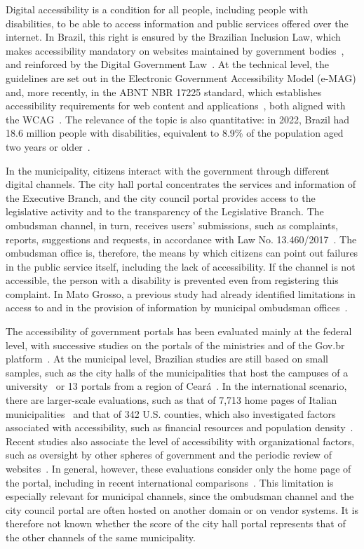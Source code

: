 \documentclass[12pt]{article}
\begin{document}
Digital accessibility is a condition for all people, including people with disabilities, to be able to access information and public services offered over the internet. In Brazil, this right is ensured by the Brazilian Inclusion Law, which makes accessibility mandatory on websites maintained by government bodies~\cite{lbi2015}, and reinforced by the Digital Government Law~\cite{lei14129}. At the technical level, the guidelines are set out in the Electronic Government Accessibility Model (e-MAG) and, more recently, in the ABNT NBR 17225 standard, which establishes accessibility requirements for web content and applications~\cite{nbr17225}, both aligned with the WCAG~\cite{wcag21}. The relevance of the topic is also quantitative: in 2022, Brazil had 18.6 million people with disabilities, equivalent to 8.9\% of the population aged two years or older~\cite{pnad2022}.

In the municipality, citizens interact with the government through different digital channels. The city hall portal concentrates the services and information of the Executive Branch, and the city council portal provides access to the legislative activity and to the transparency of the Legislative Branch. The ombudsman channel, in turn, receives users' submissions, such as complaints, reports, suggestions and requests, in accordance with Law No. 13.460/2017~\cite{lei13460}. The ombudsman office is, therefore, the means by which citizens can point out failures in the public service itself, including the lack of accessibility. If the channel is not accessible, the person with a disability is prevented even from registering this complaint. In Mato Grosso, a previous study had already identified limitations in access to and in the provision of information by municipal ombudsman offices~\cite{zahn2023}.

The accessibility of government portals has been evaluated mainly at the federal level, with successive studies on the portals of the ministries and of the Gov.br platform~\cite{sbsi,10.1145/3411564.3411656,10.1145/3658271.3658276,barros2024}. At the municipal level, Brazilian studies are still based on small samples, such as the city halls of the municipalities that host the campuses of a university~\cite{eres} or 13 portals from a region of Ceará~\cite{franca2025}. In the international scenario, there are larger-scale evaluations, such as that of 7,713 home pages of Italian municipalities~\cite{valtolina2022} and that of 342 U.S. counties, which also investigated factors associated with accessibility, such as financial resources and population density~\cite{bai2021}. Recent studies also associate the level of accessibility with organizational factors, such as oversight by other spheres of government and the periodic review of websites~\cite{frandell2026}. In general, however, these evaluations consider only the home page of the portal, including in recent international comparisons~\cite{wcge}. This limitation is especially relevant for municipal channels, since the ombudsman channel and the city council portal are often hosted on another domain or on vendor systems. It is therefore not known whether the score of the city hall portal represents that of the other channels of the same municipality.
\end{document}
